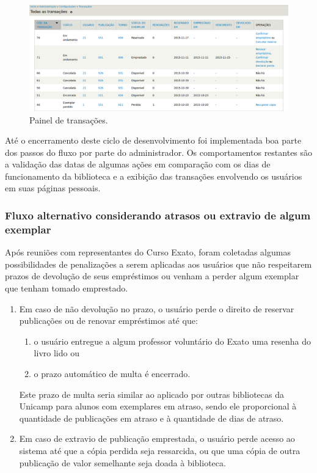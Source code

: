 \documentclass[a4paper]{article}
\begin{document}
\begin{figure}[pbth!]
\centering
\includegraphics[width=140mm, trim={35mm 0 30mm 20mm}, clip]{img/transactions.png}
\caption{Painel de transações.\label{transactions}}
\end{figure}

Até o encerramento deste ciclo de desenvolvimento foi implementada boa parte dos passos do fluxo por parte do administrador. Os comportamentos restantes são a validação das datas de algumas ações em comparação com os dias de funcionamento da biblioteca e a exibição das transações envolvendo os usuários em suas páginas pessoais.

\subsubsection{Fluxo alternativo considerando atrasos ou extravio de algum exemplar}\label{sssec:overdue_or_lost}
Após reuniões com representantes do Curso Exato, foram coletadas algumas possibilidades de penalizações a serem aplicadas aos usuários que não respeitarem prazos de devolução de seus empréstimos ou venham a perder algum exemplar que tenham tomado emprestado.

\begin{enumerate}
\item Em caso de não devolução no prazo, o usuário perde o direito de reservar publicações ou de renovar empréstimos até que:
\begin{enumerate}
\item \label{itm:option1} o usuário entregue a algum professor voluntário do Exato uma resenha do livro lido ou
\item \label{itm:option2} o prazo automático de multa é encerrado.
\end{enumerate}
Este prazo de multa seria similar ao aplicado por outras bibliotecas da Unicamp para alunos com exemplares em atraso, sendo ele proporcional à quantidade de publicações em atraso e à quantidade de dias de atraso.

\item \label{itm:option3} Em caso de extravio de publicação emprestada, o usuário perde acesso ao sistema até que a cópia perdida seja ressarcida, ou que uma cópia de outra publicação de valor semelhante seja doada à biblioteca.
\end{enumerate}
\end{document}
